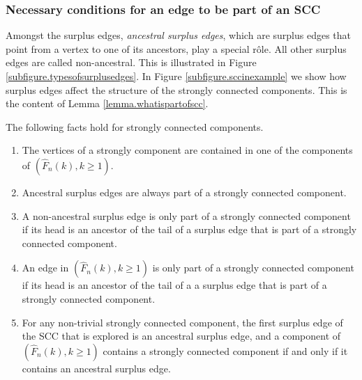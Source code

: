 \subsubsection{Necessary conditions for an edge to be part of an SCC}\label{subsubsec.defcandidates}
Amongst the surplus edges, \emph{ancestral surplus edges}, which are surplus edges that point from a vertex to one of its ancestors, play a special rôle. All other surplus edges are called non-ancestral. This is illustrated in Figure \ref{subfigure.typesofsurplusedges}. In Figure \ref{subfigure.sccinexample} we show how surplus edges affect the structure of the strongly connected components. This is the content of Lemma \ref{lemma.whatispartofscc}.
\begin{lemma}\label{lemma.whatispartofscc}
The following facts hold for strongly connected components. 
\begin{enumerate}
\item \label{item.factsonsccs1}The vertices of a strongly component are contained in one of the components of $(\hat{F}_n(k),k\geq 1)$. 
\item \label{item.factsonsccs2} Ancestral surplus edges are always part of a strongly connected component.
\item \label{item.factsonsccs4} A non-ancestral surplus edge is only part of a strongly connected component if its head is an ancestor of the tail of a surplus edge that is part of a strongly connected component.
\item \label{item.factsonsccs4andabit} An edge in $(\hat{F}_n(k),k\geq 1)$ is only part of a strongly connected component if its head is an ancestor of the tail of a a surplus edge that is part of a strongly connected component.
\item \label{item.factsonsccs5} For any non-trivial strongly connected component, the first surplus edge of the SCC that is explored is an ancestral surplus edge, and a component of  $(\hat{F}_n(k),k\geq 1)$ contains a strongly connected component if and only if it contains an ancestral surplus edge.
\end{enumerate}
\end{lemma}
